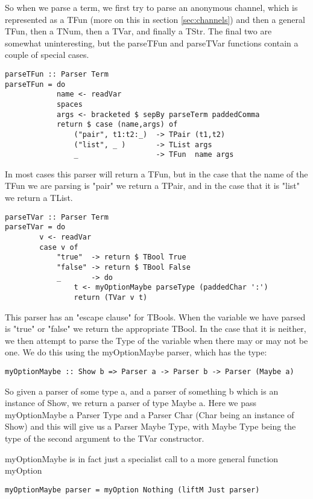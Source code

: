 So when we parse a term, we first try to parse an anonymous channel, which is represented as a TFun (more on this in section \ref{sec:channels}) and then a general TFun, then a TNum, then a TVar, and finally a TStr.
The final two are somewhat uninteresting,  but the parseTFun and parseTVar functions contain a couple of special cases.

\begin{verbatim}
parseTFun :: Parser Term
parseTFun = do
            name <- readVar
            spaces
            args <- bracketed $ sepBy parseTerm paddedComma
            return $ case (name,args) of
                ("pair", t1:t2:_)  -> TPair (t1,t2)
                ("list", _ )       -> TList args
                _                  -> TFun  name args 
\end{verbatim}

In most cases this parser will return a TFun, but in the case that the name of the TFun we are parsing is "pair" we return a TPair, and in the case that it is "list" we return a TList.

\begin{verbatim}
parseTVar :: Parser Term
parseTVar = do
        v <- readVar
        case v of
            "true"  -> return $ TBool True
            "false" -> return $ TBool False
            _       -> do
                t <- myOptionMaybe parseType (paddedChar ':') 
                return (TVar v t)
\end{verbatim}

This parser has an "escape clause" for TBools. When the variable we have parsed is "true" or "false" we return the appropriate TBool. In the case that it is neither, we then attempt to parse the Type of the variable when there may or may not be one. We do this using the myOptionMaybe parser, which has the type:

\begin{verbatim}
myOptionMaybe :: Show b => Parser a -> Parser b -> Parser (Maybe a)
\end{verbatim}

So given a parser of some type a, and a parser of something b which is an instance of Show, we return a parser of type Maybe a. Here we pass myOptionMaybe a Parser Type and a Parser Char (Char being an instance of Show) and this will give us a Parser Maybe Type, with Maybe Type being the type of the second argument to the TVar constructor.

myOptionMaybe is in fact just a specialist call to a more general function myOption
\begin{verbatim}
myOptionMaybe parser = myOption Nothing (liftM Just parser)
\end{verbatim}

